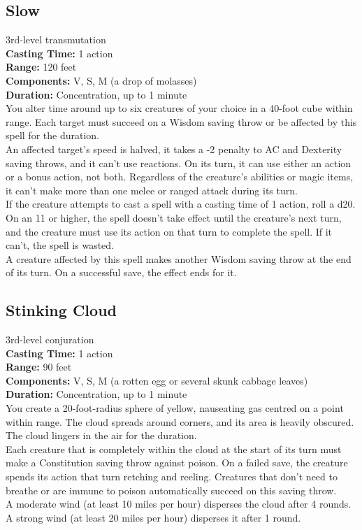 \documentclass[11pt, A4paper, english]{article}
\begin{document}
		\subsection{Slow}
3rd-level transmutation \\
\textbf{Casting Time:} 1 action \\
\textbf{Range:} 120 feet \\
\textbf{Components:} V, S, M (a drop of molasses) \\
\textbf{Duration:} Concentration, up to 1 minute \\
You alter time around up to six creatures of your choice in a 40-foot cube within range. Each target must succeed on a Wisdom saving throw or be affected by this spell for the duration. \\
An affected target's speed is halved, it takes a -2 penalty to AC and Dexterity saving throws, and it can't use reactions. On its turn, it can use either an action or a bonus action, not both. Regardless of the creature's abilities or magic items, it can't make more than one melee or ranged attack during its turn. \\
If the creature attempts to cast a spell with a casting time of 1 action, roll a d20. On an 11 or higher, the spell doesn't take effect until the creature's next turn, and the creature must use its action on that turn to complete the spell. If it can't, the spell is wasted. \\
A creature affected by this spell makes another Wisdom saving throw at the end of its turn. On a successful save, the effect ends for it.

		\subsection{Stinking Cloud}
3rd-level conjuration \\
\textbf{Casting Time:} 1 action \\
\textbf{Range:} 90 feet \\
\textbf{Components:} V, S, M (a rotten egg or several skunk cabbage leaves) \\
\textbf{Duration:} Concentration, up to 1 minute \\
You create a 20-foot-radius sphere of yellow, nauseating gas centred on a point within range. The cloud spreads around corners, and its area is heavily obscured. The cloud lingers in the air for the duration. \\
Each creature that is completely within the cloud at the start of its turn must make a Constitution saving throw against poison. On a failed save, the creature spends its action that turn retching and reeling. Creatures that don't need to breathe or are immune to poison automatically succeed on this saving throw. \\
A moderate wind (at least 10 miles per hour) disperses the cloud after 4 rounds. A strong wind (at least 20 miles per hour) disperses it after 1 round.
\end{document}

